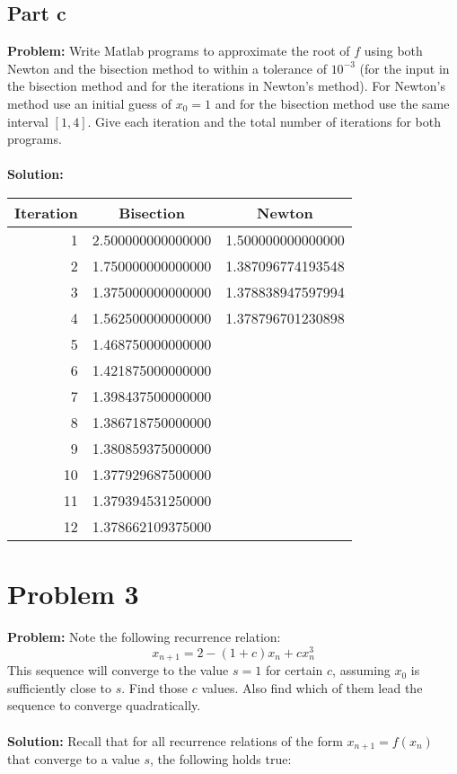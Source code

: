 \documentclass{article}
\begin{document}
\subsection*{Part c}
\textbf{Problem:} Write Matlab programs to approximate the root of $f$ using both Newton and the bisection method to within a tolerance of $10^{-3}$ (for the input in the bisection method and for the iterations in Newton's method). For Newton's method use an initial guess of $x_0=1$ and for the bisection method use the same interval $[1,4]$. Give each iteration and the total number of iterations for both programs.
\\\\
\textbf{Solution:}
\begin{center}
\begin{tabular}{r|c|c}
      Iteration & Bisection & Newton\\
      \hline
      1 & 2.500000000000000 & 1.500000000000000\\
      2 & 1.750000000000000 & 1.387096774193548\\
      3 & 1.375000000000000 & 1.378838947597994\\
      4 & 1.562500000000000 & 1.378796701230898\\
      5 & 1.468750000000000 \\
      6 & 1.421875000000000 \\
      7 & 1.398437500000000 \\
      8 & 1.386718750000000 \\
      9 & 1.380859375000000 \\
      10 & 1.377929687500000 \\
      11 & 1.379394531250000 \\
      12 & 1.378662109375000
\end{tabular}
\end{center}

\section*{Problem 3}
\textbf{Problem:} Note the following recurrence relation:
$$x_{n+1}=2-(1+c)x_n+cx_n^3$$
This sequence will converge to the value $s=1$ for certain $c$, assuming $x_0$ is sufficiently close to $s$. Find those $c$ values. Also find which of them lead the sequence to converge quadratically.
\\\\
\textbf{Solution:} Recall that for all recurrence relations of the form $x_{n+1}=f(x_n)$ that converge to a value $s$, the following holds true:
\end{document}
